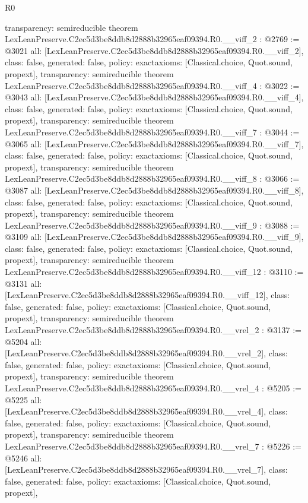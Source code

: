 \begin{lexlean}{R0}
\begin{coremodule}
{  transparency: semireducible
}
theorem LexLeanPreserve.C2ec5d3be8ddb8d2888b32965eaf09394.R0.__viff_2 : @2769 := @3021 {
  all: [LexLeanPreserve.C2ec5d3be8ddb8d2888b32965eaf09394.R0.__viff_2],
  class: false,
  generated: false,
  policy: exact{axioms: [Classical.choice, Quot.sound, propext]},
  transparency: semireducible
}
theorem LexLeanPreserve.C2ec5d3be8ddb8d2888b32965eaf09394.R0.__viff_4 : @3022 := @3043 {
  all: [LexLeanPreserve.C2ec5d3be8ddb8d2888b32965eaf09394.R0.__viff_4],
  class: false,
  generated: false,
  policy: exact{axioms: [Classical.choice, Quot.sound, propext]},
  transparency: semireducible
}
theorem LexLeanPreserve.C2ec5d3be8ddb8d2888b32965eaf09394.R0.__viff_7 : @3044 := @3065 {
  all: [LexLeanPreserve.C2ec5d3be8ddb8d2888b32965eaf09394.R0.__viff_7],
  class: false,
  generated: false,
  policy: exact{axioms: [Classical.choice, Quot.sound, propext]},
  transparency: semireducible
}
theorem LexLeanPreserve.C2ec5d3be8ddb8d2888b32965eaf09394.R0.__viff_8 : @3066 := @3087 {
  all: [LexLeanPreserve.C2ec5d3be8ddb8d2888b32965eaf09394.R0.__viff_8],
  class: false,
  generated: false,
  policy: exact{axioms: [Classical.choice, Quot.sound, propext]},
  transparency: semireducible
}
theorem LexLeanPreserve.C2ec5d3be8ddb8d2888b32965eaf09394.R0.__viff_9 : @3088 := @3109 {
  all: [LexLeanPreserve.C2ec5d3be8ddb8d2888b32965eaf09394.R0.__viff_9],
  class: false,
  generated: false,
  policy: exact{axioms: [Classical.choice, Quot.sound, propext]},
  transparency: semireducible
}
theorem LexLeanPreserve.C2ec5d3be8ddb8d2888b32965eaf09394.R0.__viff_12 : @3110 := @3131 {
  all: [LexLeanPreserve.C2ec5d3be8ddb8d2888b32965eaf09394.R0.__viff_12],
  class: false,
  generated: false,
  policy: exact{axioms: [Classical.choice, Quot.sound, propext]},
  transparency: semireducible
}
theorem LexLeanPreserve.C2ec5d3be8ddb8d2888b32965eaf09394.R0.__vrel_2 : @3137 := @5204 {
  all: [LexLeanPreserve.C2ec5d3be8ddb8d2888b32965eaf09394.R0.__vrel_2],
  class: false,
  generated: false,
  policy: exact{axioms: [Classical.choice, Quot.sound, propext]},
  transparency: semireducible
}
theorem LexLeanPreserve.C2ec5d3be8ddb8d2888b32965eaf09394.R0.__vrel_4 : @5205 := @5225 {
  all: [LexLeanPreserve.C2ec5d3be8ddb8d2888b32965eaf09394.R0.__vrel_4],
  class: false,
  generated: false,
  policy: exact{axioms: [Classical.choice, Quot.sound, propext]},
  transparency: semireducible
}
theorem LexLeanPreserve.C2ec5d3be8ddb8d2888b32965eaf09394.R0.__vrel_7 : @5226 := @5246 {
  all: [LexLeanPreserve.C2ec5d3be8ddb8d2888b32965eaf09394.R0.__vrel_7],
  class: false,
  generated: false,
  policy: exact{axioms: [Classical.choice, Quot.sound, propext]},
}
\end{coremodule}
\end{lexlean}
